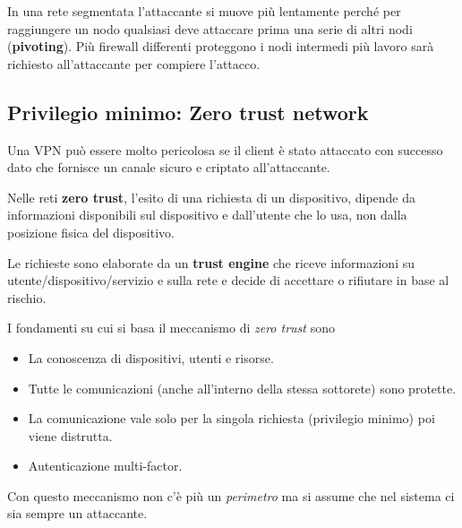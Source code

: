 In una rete segmentata l'attaccante si muove più lentamente perché per raggiungere un nodo qualsiasi deve attaccare
prima una serie di altri nodi (\textbf{pivoting}). Più firewall differenti proteggono i nodi intermedi più lavoro sarà
richiesto all'attaccante per compiere l'attacco.

\subsection{Privilegio minimo: Zero trust network}
Una VPN può essere molto pericolosa se il client è stato attaccato con successo dato che fornisce un canale sicuro e
criptato all'attaccante.

Nelle reti \textbf{zero trust}, l'esito di una richiesta di un dispositivo, dipende da informazioni disponibili sul
dispositivo e dall'utente che lo usa, non dalla posizione fisica del dispositivo.

Le richieste sono elaborate da un \textbf{trust engine} che riceve informazioni su utente/dispositivo/servizio e sulla
rete e decide di accettare o rifiutare in base al rischio.

I fondamenti su cui si basa il meccanismo di \emph{zero trust} sono
\begin{itemize}
	\item La conoscenza di dispositivi, utenti e risorse.
	\item Tutte le comunicazioni (anche all'interno della stessa sottorete) sono protette.
	\item La comunicazione vale solo per la singola richiesta (privilegio minimo) poi viene distrutta.
	\item Autenticazione multi-factor.
\end{itemize}
Con questo meccanismo non c'è più un \emph{perimetro} ma si assume che nel sistema ci sia sempre un attaccante.
